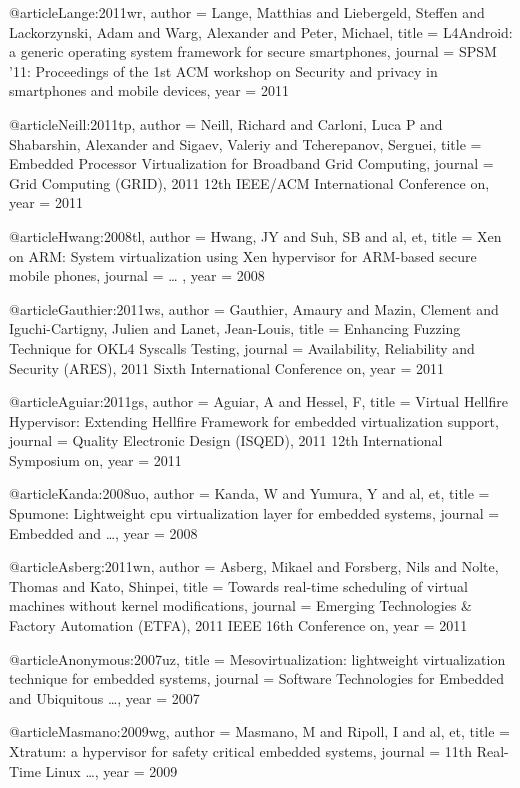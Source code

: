 @article{Lange:2011wr,
author = {Lange, Matthias and Liebergeld, Steffen and Lackorzynski, Adam and Warg, Alexander and Peter, Michael},
title = {{L4Android: a generic operating system framework for secure smartphones}},
journal = {SPSM '11: Proceedings of the 1st ACM workshop on Security and privacy in smartphones and mobile devices},
year = {2011}
}

@article{Neill:2011tp,
author = {Neill, Richard and Carloni, Luca P and Shabarshin, Alexander and Sigaev, Valeriy and Tcherepanov, Serguei},
title = {{Embedded Processor Virtualization for Broadband Grid Computing}},
journal = {Grid Computing (GRID), 2011 12th IEEE/ACM International Conference on},
year = {2011}
}

@article{Hwang:2008tl,
author = {Hwang, JY and Suh, SB and al, et},
title = {{Xen on ARM: System virtualization using Xen hypervisor for ARM-based secure mobile phones}},
journal = {{\ldots} },
year = {2008}
}

@article{Gauthier:2011ws,
author = {Gauthier, Amaury and Mazin, Clement and Iguchi-Cartigny, Julien and Lanet, Jean-Louis},
title = {{Enhancing Fuzzing Technique for OKL4 Syscalls Testing}},
journal = {Availability, Reliability and Security (ARES), 2011 Sixth International Conference on},
year = {2011}
}

@article{Aguiar:2011gs,
author = {Aguiar, A and Hessel, F},
title = {{Virtual Hellfire Hypervisor: Extending Hellfire Framework for embedded virtualization support}},
journal = {Quality Electronic Design (ISQED), 2011 12th International Symposium on},
year = {2011}
}

@article{Kanda:2008uo,
author = {Kanda, W and Yumura, Y and al, et},
title = {{Spumone: Lightweight cpu virtualization layer for embedded systems}},
journal = {Embedded and  {\ldots}},
year = {2008}
}

@article{Asberg:2011wn,
author = {Asberg, Mikael and Forsberg, Nils and Nolte, Thomas and Kato, Shinpei},
title = {{Towards real-time scheduling of virtual machines without kernel modifications}},
journal = {Emerging Technologies {\&} Factory Automation (ETFA), 2011 IEEE 16th Conference on},
year = {2011}
}

@article{Anonymous:2007uz,
title = {{Mesovirtualization: lightweight virtualization technique for embedded systems}},
journal = {Software Technologies for Embedded and Ubiquitous  {\ldots}},
year = {2007}
}

@article{Masmano:2009wg,
author = {Masmano, M and Ripoll, I and al, et},
title = {{Xtratum: a hypervisor for safety critical embedded systems}},
journal = {11th Real-Time Linux  {\ldots}},
year = {2009}
}

